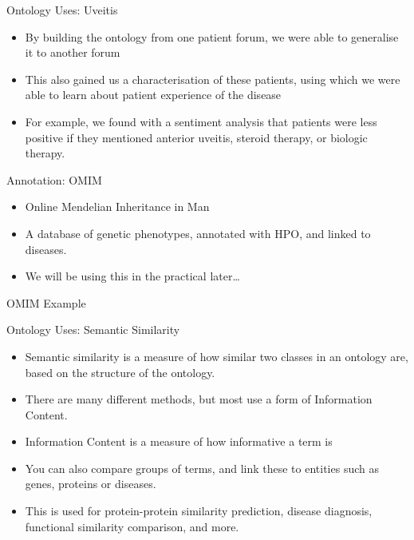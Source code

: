 \documentclass[aspectratio=169]{beamer} %
\begin{document}
\begin{frame}{Ontology Uses: Uveitis}
  \begin{itemize}
    \item By building the ontology from one patient forum, we were able to
    generalise it to another forum
    \item This also gained us a characterisation of these patients, using which
    we were able to learn about patient experience of the disease
    \item For example, we found with a sentiment analysis that patients were
    less positive if they mentioned anterior uveitis, steroid therapy, or biologic therapy.
  \end{itemize}
\end{frame}

\begin{frame}{Annotation: OMIM}
  \begin{itemize}
    \item Online Mendelian Inheritance in Man
    \item A database of genetic phenotypes, annotated with HPO, and linked to diseases.
    \item We will be using this in the practical later\ldots
  \end{itemize}
\end{frame}

\begin{frame}{OMIM Example}
\end{frame}

\begin{frame}{Ontology Uses: Semantic Similarity}
  \begin{itemize}
    \item Semantic similarity is a measure of how similar two classes in an
    ontology are, based on the structure of the ontology.
    \item There are many different methods, but most use a form of Information
    Content.
    \item Information Content is a measure of how informative a term is
    \item You can also compare groups of terms, and link these to entities such
    as genes, proteins or diseases.
    \item This is used for protein-protein similarity prediction, disease diagnosis, functional similarity comparison, and more.
  \end{itemize}
\end{frame}
\end{document}
